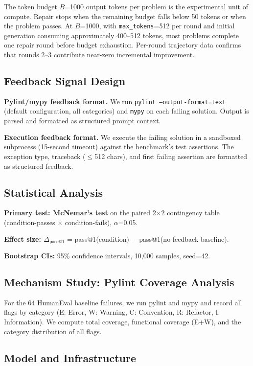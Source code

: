 The token budget $B$=1000 output tokens per problem is the experimental unit of compute. Repair stops when the remaining budget falls below 50 tokens or when the problem passes. At $B$=1000, with \texttt{max\_tokens}=512 per round and initial generation consuming approximately 400--512 tokens, most problems complete one repair round before budget exhaustion. Per-round trajectory data confirms that rounds 2--3 contribute near-zero incremental improvement.

\subsection{Feedback Signal Design}

\textbf{Pylint/mypy feedback format.} We run \texttt{pylint --output-format=text} (default configuration, all categories) and \texttt{mypy} on each failing solution. Output is parsed and formatted as structured prompt context.

\textbf{Execution feedback format.} We execute the failing solution in a sandboxed subprocess (15-second timeout) against the benchmark's test assertions. The exception type, traceback ($\leq$512 chars), and first failing assertion are formatted as structured feedback.

\subsection{Statistical Analysis}

\textbf{Primary test: McNemar's test} on the paired 2$\times$2 contingency table (condition-passes $\times$ condition-fails), $\alpha$=0.05.

\textbf{Effect size: $\Delta_{\text{pass@1}}$} = pass@1(condition) $-$ pass@1(no-feedback baseline).

\textbf{Bootstrap CIs:} 95\% confidence intervals, 10,000 samples, seed=42.

\subsection{Mechanism Study: Pylint Coverage Analysis}

For the 64 HumanEval baseline failures, we run pylint and mypy and record all flags by category (E: Error, W: Warning, C: Convention, R: Refactor, I: Information). We compute total coverage, functional coverage (E+W), and the category distribution of all flags.

\subsection{Model and Infrastructure}

